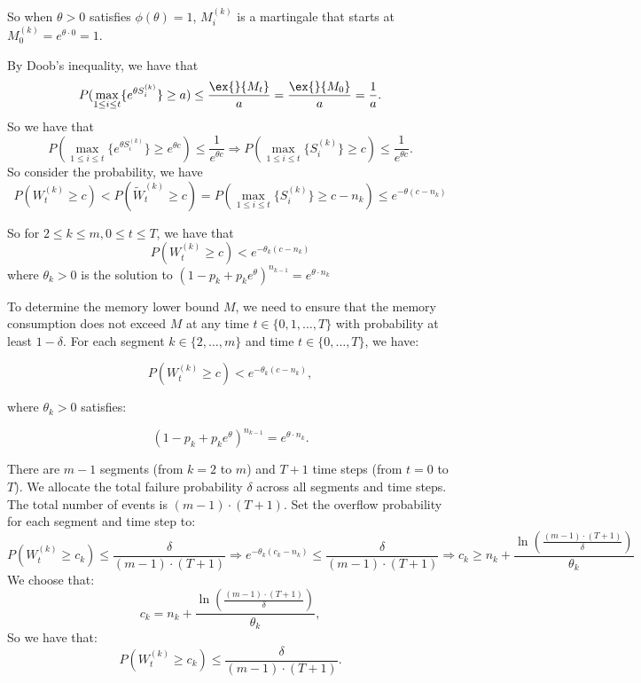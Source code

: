 So when $\theta>0$ satisfies $\phi(\theta)=1$, $M_i^{(k)}$ is a martingale that starts at $M_0^{(k)}= e^{\theta\cdot 0}=1 $.

By Doob's inequality, we have that
$$P(\max_{1\leq i
\leq t}\{ e^{\theta S_i^{(k)}} \}\geq a)\leq \frac{\ex{}{M_t}}{a} = \frac{\ex{}{M_0}}{a}= \frac{1}{a}.$$
So we have that
$$P(\max_{1\leq i
\leq t}\{ e^{\theta S_i^{(k)}}\} \geq e^{\theta c})\leq \frac{1}{e^{\theta c}}  \Rightarrow P(\max_{1\leq i
\leq t}\{  S_i^{(k)}\} \geq c)\leq \frac{1}{e^{\theta c}} .$$
So consider the probability, we have 
$$P\left(  W_t^{(k)}\geq c  \right) <P\left(  \tilde{W}_t^{(k)}\geq c  \right) = P(\max_{1\leq i
\leq t}\{  S_i^{(k)}\} \geq c - n_k)\leq e^{-\theta (c - n_k)}$$

So for $2\leq k\leq m, 0\leq t\leq T$, we have that
$$P\left(  W_t^{(k)}\geq c  \right)< e^{-\theta_k (c - n_k)}$$
where $\theta_k>0$ is the solution to $(1-p_k+p_ke^{\theta})^{n_{k-1}}=e^{\theta \cdot n_k}$

To determine the memory lower bound \( M \), we need to ensure that the memory consumption does not exceed \( M \) at any time \( t \in \{0, 1, \dots, T\} \) with probability at least \( 1 - \delta \). For each segment \( k \in \{2, \dots, m\} \) and time \( t \in \{0, \dots, T\} \), we have: 

\[ P\left( W_t^{(k)} \geq c \right) < e^{-\theta_k (c - n_k)}, \]

where \( \theta_k > 0 \) satisfies:

\[ (1 - p_k + p_k e^{\theta})^{n_{k-1}} = e^{\theta \cdot  n_k}. \]

There are \( m - 1 \) segments (from \( k = 2 \) to \( m \)) and \( T + 1 \) time steps (from \( t = 0 \) to \( T \)). We allocate the total failure probability \( \delta \) across all segments and time steps. The total number of events is \( (m - 1) \cdot (T + 1) \). Set the overflow probability for each segment and time step to:
\[ P\left( W_t^{(k)} \geq c_k \right) \leq \frac{\delta}{(m - 1) \cdot (T + 1)}\Rightarrow e^{-\theta_k (c_k - n_k)} \leq \frac{\delta}{(m - 1) \cdot (T + 1)}\Rightarrow c_k \geq n_k + \frac{\ln\left( \frac{(m - 1) \cdot (T + 1)}{\delta} \right)}{\theta_k} \]
We choose that:
\[ c_k = n_k + \frac{\ln\left( \frac{(m - 1) \cdot (T + 1)}{\delta} \right)}{\theta_k}, \]
So we have that:
\[ P\left( W_t^{(k)} \geq c_k \right) \leq \frac{\delta}{(m - 1) \cdot (T + 1)}. \]

